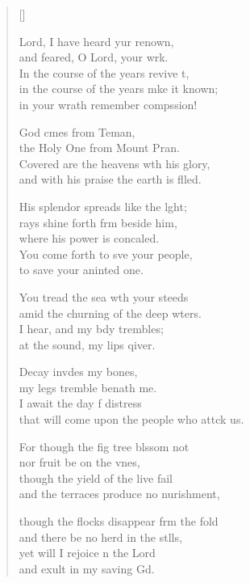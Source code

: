 \settowidth{\versewidth}{He makes my feet swift as those of hinds and more..}
\begin{verse}[\versewidth]
  \begin{patverse}
 Lord, I have heard yur renown,\Med\\
and feared, O Lord, your wrk.\\
In the course of the years revive \pointup{\i}t,\Flex\\
in the course of the years mke it known;\Med\\
in your wrath remember compssion!

God cmes from Teman,\Med\\
the Holy One from Mount Pran.\\
Covered are the heavens w\pointup{\i}th his glory,\Med\\
and with his praise the earth is f\pointup{\i}lled.

His splendor spreads like the l\pointup{\i}ght;\Flex\\
rays shine forth frm beside him,\Med\\
where his power is concaled.\\
You come forth to sve your people,\Med\\
to save your aninted one.

You tread the sea w\pointup{\i}th your steeds\Med\\
amid the churning of the deep wters.\\
I hear, and my bdy trembles;\Med\\
at the sound, my lips qiver.

Decay invdes my bones,\Med\\
my legs tremble benath me.\\
I await the day f distress\Med\\
that will come upon the people who attck us.

For though the fig tree blssom not\Med\\
nor fruit be on the v\pointup{\i}nes,\\
though the yield of the live fail\Med\\
and the terraces produce no nurishment,

though the flocks disappear frm the fold\Med\\
and there be no herd in the stlls,\\
yet will I rejoice \pointup{\i}n the Lord\Med\\
and exult in my saving Gd.


\end{patverse}
\end{verse}
